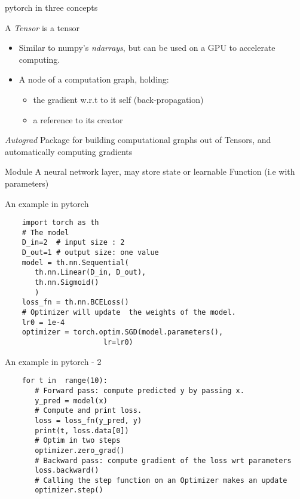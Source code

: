 \begin{frame}{pytorch in three concepts}
  \begin{block}{A \textit{Tensor} is a tensor}
    \begin{itemize}
    \item Similar to numpy’s \textit{ndarrays}, but can be used on a
      GPU to accelerate computing.
    \item A node of a computation graph, holding:
      \begin{itemize}
      \item the gradient w.r.t to it self (back-propagation)
      \item a reference  to its creator
      \end{itemize}
    \end{itemize}
  \end{block}


  \begin{block}{\textit{Autograd}}
    Package for building computational graphs out of Tensors, and
    automatically computing gradients
  \end{block}
  
  \begin{block}{Module}
    A neural network layer,  may store state or
    learnable  Function (i.e with parameters)
  \end{block}
\end{frame}



\begin{frame}[fragile]{An example in pytorch}
  
  \begin{verbatim}
    import torch as th
    # The model 
    D_in=2  # input size : 2 
    D_out=1 # output size: one value 
    model = th.nn.Sequential(
       th.nn.Linear(D_in, D_out),
       th.nn.Sigmoid()    
       )
    loss_fn = th.nn.BCELoss()
    # Optimizer will update  the weights of the model. 
    lr0 = 1e-4 
    optimizer = torch.optim.SGD(model.parameters(),
                       lr=lr0) 
  \end{verbatim}
\end{frame}

\begin{frame}[fragile]{An example in pytorch - 2}
  \begin{verbatim}
    for t in  range(10): 
       # Forward pass: compute predicted y by passing x.  
       y_pred = model(x)
       # Compute and print loss.  
       loss = loss_fn(y_pred, y) 
       print(t, loss.data[0])
       # Optim in two steps
       optimizer.zero_grad()
       # Backward pass: compute gradient of the loss wrt parameters 
       loss.backward()
       # Calling the step function on an Optimizer makes an update 
       optimizer.step()
  \end{verbatim}
\end{frame}


